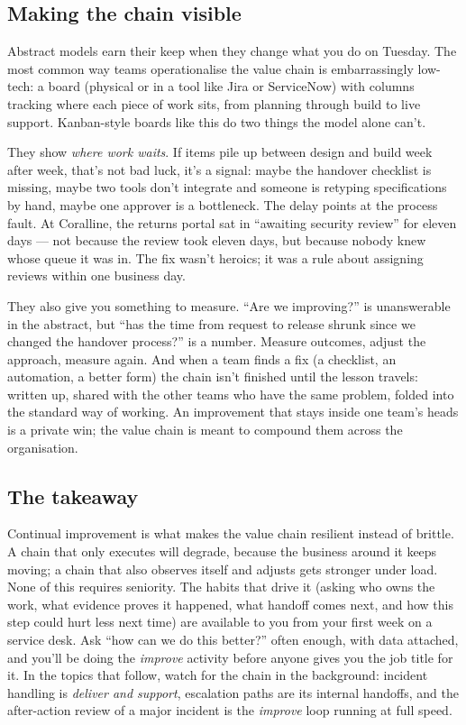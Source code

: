\subsection{Making the chain visible}


Abstract models earn their keep when they change what you do on Tuesday. The most common way teams operationalise the value chain is embarrassingly low-tech: a board (physical or in a tool like Jira or ServiceNow) with columns tracking where each piece of work sits, from planning through build to live support. Kanban-style boards like this do two things the model alone can't.


They show \emph{where work waits}. If items pile up between design and build week after week, that's not bad luck, it's a signal: maybe the handover checklist is missing, maybe two tools don't integrate and someone is retyping specifications by hand, maybe one approver is a bottleneck. The delay points at the process fault. At Coralline, the returns portal sat in ``awaiting security review'' for eleven days — not because the review took eleven days, but because nobody knew whose queue it was in. The fix wasn't heroics; it was a rule about assigning reviews within one business day.


They also give you something to measure. ``Are we improving?'' is unanswerable in the abstract, but ``has the time from request to release shrunk since we changed the handover process?'' is a number. Measure outcomes, adjust the approach, measure again. And when a team finds a fix (a checklist, an automation, a better form) the chain isn't finished until the lesson travels: written up, shared with the other teams who have the same problem, folded into the standard way of working. An improvement that stays inside one team's heads is a private win; the value chain is meant to compound them across the organisation.



\subsection{The takeaway}


Continual improvement is what makes the value chain resilient instead of brittle. A chain that only executes will degrade, because the business around it keeps moving; a chain that also observes itself and adjusts gets stronger under load. None of this requires seniority. The habits that drive it (asking who owns the work, what evidence proves it happened, what handoff comes next, and how this step could hurt less next time) are available to you from your first week on a service desk. Ask ``how can we do this better?'' often enough, with data attached, and you'll be doing the \emph{improve} activity before anyone gives you the job title for it. In the topics that follow, watch for the chain in the background: incident handling is \emph{deliver and support}, escalation paths are its internal handoffs, and the after-action review of a major incident is the \emph{improve} loop running at full speed.


